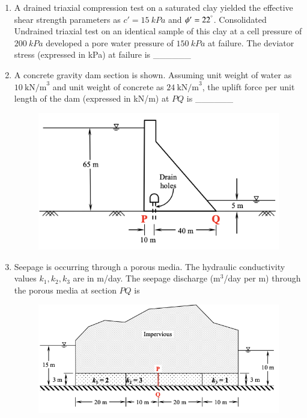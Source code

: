 \documentclass[journal]{IEEEtran}
\begin{document}
\begin{enumerate}[resume]
\item A drained triaxial compression test on a saturated clay yielded the effective shear strength parameters as $c' = 15 \ kPa$ and $\phi' = 22^\degree$. Consolidated Undrained triaxial test on an identical sample of this clay at a cell pressure of $200 \ kPa$ developed a pore water pressure of $150 \ kPa$ at failure. The deviator stress (expressed in kPa) at failure is \_\_\_\_\_\_ \hfill {}

\item A concrete gravity dam section is shown. Assuming unit weight of water as $10 \ \text{kN/m}^3$ and unit weight of concrete as $24 \ \text{kN/m}^3$, the uplift force per unit length of the dam (expressed in kN/m) at $PQ$ is \_\_\_\_\_\_ \hfill {}

\begin{figure}[H]
    \centering
    \includegraphics[width=0.6\columnwidth]{figs/Q55.png} 
    \caption{}
    \label{fig:placeholder}
\end{figure}

\item Seepage is occurring through a porous media. The hydraulic conductivity values $k_1, k_2, k_3$ are in m/day. The seepage discharge (m$^3$/day per m) through the porous media at section $PQ$ is  \hfill {}

\begin{figure}[H]
    \centering
    \includegraphics[width=0.6\columnwidth]{figs/Q56.png} 
    \caption{}
    \label{fig:placeholder}
\end{figure}

\begin{enumerate}
\end{enumerate}


\end{enumerate}
\end{document}
